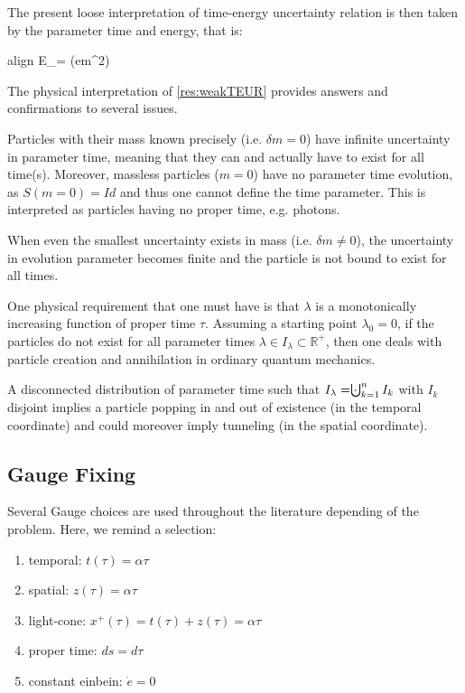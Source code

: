 \documentclass[a4paper,10pt]{article}
\numberwithin{equation}{section}
\newcommand{\boxedeq}[2]{\begin{empheq}[box={\fboxsep=6pt\fbox}]{align}\label{#1}#2\end{empheq}}
\begin{document}
The present loose interpretation of time-energy uncertainty relation is then taken by the parameter time and energy, that is:
\boxedeq{res:weakTEUR}{
    \Delta E_\lambda \Delta \lambda = \Delta (em^2) \Delta \lambda \approx \hbar
}

The physical interpretation of \ref{res:weakTEUR} provides answers and confirmations to several issues. 

Particles with their mass  known precisely (i.e. $\delta m = 0$) have infinite uncertainty in parameter time, meaning that they can and actually have to exist for all time(s). Moreover, massless particles ($m=0$) have no parameter time evolution, as $S(m=0) = Id$ and thus one cannot define the time parameter. This is interpreted as particles having no proper time, e.g. photons.

When even the smallest uncertainty exists in mass (i.e. $\delta m \neq 0$), the uncertainty in evolution parameter becomes finite and the particle is not bound to exist for all times.

One physical requirement that one must have is that $\lambda$ is a monotonically increasing function of proper time $\tau$. Assuming a starting point $\lambda_0= 0$, if the particles do not exist for all parameter times $\lambda \in I_\lambda \subset \mathbb{R}^+$, then one deals with particle creation and annihilation in ordinary quantum mechanics. 

A disconnected distribution of parameter time such that $I_\lambda = \cdot \hspace{-7pt}\bigcup_{k=1}^n I_k $ with $I_k$ disjoint implies a particle popping in and out of existence (in the temporal coordinate) and could moreover imply tunneling (in the spatial coordinate).




\subsection{Gauge Fixing}
\label{sec:gaugefixing}
Several Gauge choices are used throughout the literature depending of the problem. Here, we remind a selection:
\begin{enumerate}
    \item temporal: $t(\tau) = \alpha \tau$
    
    \item spatial: $z(\tau) = \alpha \tau$
    
    \item light-cone: $x^+(\tau) = t(\tau) + z(\tau) = \alpha \tau$
    
    \item proper time: $ds = d\tau$
    
    \item constant einbein: $\dot{e} = 0$
\end{enumerate}
\end{document}
